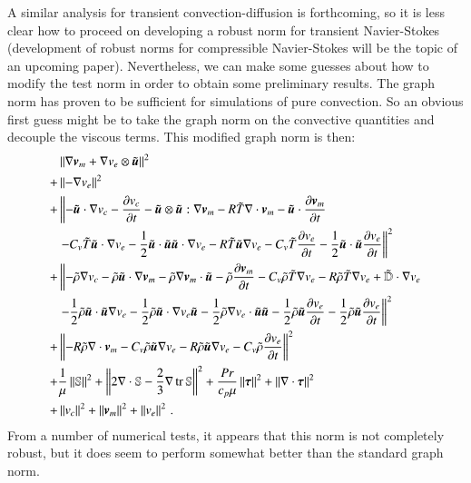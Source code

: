\documentclass[preprint,12pt]{elsarticle}
\begin{document}
A similar analysis for transient convection-diffusion is forthcoming, 
so it is less clear how to proceed on developing a robust norm for transient Navier-Stokes
(development of robust norms for compressible Navier-Stokes will be the topic of an upcoming paper).
Nevertheless, we can make some guesses about how to modify the test norm in order to obtain some preliminary results.
The graph norm has proven to be sufficient for simulations of pure convection. 
So an obvious first guess might be to take the graph norm on the convective quantities and decouple the viscous terms.
This modified graph norm is then:
\begin{equation}
\begin{aligned}
&\left\| \nabla\boldsymbol v_m+\nabla v_e\otimes\tilde{\boldsymbol u} \right\|^2\\
+&\left\| -\nabla v_e \right\|^2\\
+&\left\|
-\tilde{\boldsymbol u}\cdot\nabla v_c-\frac{\partial v_c}{\partial t}-\tilde{\boldsymbol u}\otimes\tilde{\boldsymbol u}:\nabla\boldsymbol v_m
-R\tilde T\nabla\cdot\boldsymbol v_m-\tilde{\boldsymbol u}\cdot\frac{\partial\boldsymbol v_m}{\partial t}\right.\\
&\left.-C_v\tilde T\tilde{\boldsymbol u}\cdot\nabla v_e-\frac{1}{2}\tilde{\boldsymbol u}\cdot\tilde{\boldsymbol u}\tilde{\boldsymbol u}\cdot\nabla v_e
-R\tilde T\tilde{\boldsymbol u}\nabla v_e
-C_v\tilde T\frac{\partial v_e}{\partial t}-\frac{1}{2}\tilde{\boldsymbol u}\cdot\tilde{\boldsymbol u}\frac{\partial v_e}{\partial t}
\right\|^2\\
+&\left\|
-\tilde\rho\nabla v_c
-\tilde\rho\tilde{\boldsymbol u}\cdot\nabla\boldsymbol v_m-\tilde\rho\nabla\boldsymbol v_m\cdot\tilde{\boldsymbol u}
-\tilde\rho\frac{\partial\boldsymbol v_m}{\partial t}
-C_v\tilde\rho\tilde T\nabla v_e
-R\tilde\rho\tilde T\nabla v_e
+\tilde{\mathbb{D}}\cdot\nabla v_e
\right.\\
&\left.
-\frac{1}{2}\tilde\rho\tilde{\boldsymbol u}\cdot\tilde{\boldsymbol u}\nabla v_e
-\frac{1}{2}\tilde\rho\tilde{\boldsymbol u}\cdot\nabla v_e\tilde{\boldsymbol u}
-\frac{1}{2}\tilde\rho\nabla v_e\cdot\tilde{\boldsymbol u}\tilde{\boldsymbol u}
-\frac{1}{2}\tilde\rho\tilde{\boldsymbol u}\frac{\partial v_e}{\partial t}
-\frac{1}{2}\tilde\rho\tilde{\boldsymbol u}\frac{\partial v_e}{\partial t}
\right\|^2\\
+&\left\|
-R\tilde\rho\nabla\cdot\boldsymbol v_m
-C_v\tilde\rho\tilde{\boldsymbol u}\nabla v_e
-R\tilde\rho\tilde{\boldsymbol u}\nabla v_e
-C_v\tilde\rho\frac{\partial v_e}{\partial t}
\right\|^2\\
+&\frac{1}{\mu}\left\| \mathbb{S} \right\|^2
+\left\| 2\nabla\cdot\mathbb{S}-\frac{2}{3}\nabla\operatorname*{tr}{\mathbb{S}} \right\|^2
+\frac{Pr}{c_p\mu}\left\| \boldsymbol\tau \right\|^2
+\left\| \nabla\cdot\boldsymbol\tau \right\|^2\\
+&\left\| v_c \right\|^2
+\left\| \boldsymbol v_m \right\|^2
+\left\| v_e \right\|^2
\,.
\end{aligned}
\end{equation}
From a number of numerical tests, it appears that this norm is not completely robust, but it does seem to perform somewhat better
than the standard graph norm.
\end{document}
